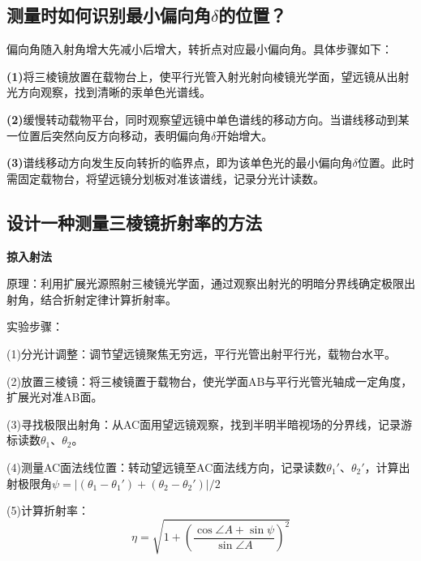 \documentclass[]{../../templates/Report}%
\begin{document}
\begin{fullreportonly}
\subsection{测量时如何识别最小偏向角$\delta$的位置？}
偏向角随入射角增大先减小后增大，转折点对应最小偏向角。具体步骤如下：
\par
\textbf{(1)}将三棱镜放置在载物台上，使平行光管入射光射向棱镜光学面，望远镜从出射光方向观察，找到清晰的汞单色光谱线。
\par
\textbf{(2)}缓慢转动载物平台，同时观察望远镜中单色谱线的移动方向。当谱线移动到某一位置后突然向反方向移动，表明偏向角$\delta$开始增大。
\par
\textbf{(3)}谱线移动方向发生反向转折的临界点，即为该单色光的最小偏向角$\delta$位置。此时需固定载物台，将望远镜分划板对准该谱线，记录分光计读数。
\subsection{设计一种测量三棱镜折射率的方法}
\textbf{掠入射法}
\par
原理：利用扩展光源照射三棱镜光学面，通过观察出射光的明暗分界线确定极限出射角，结合折射定律计算折射率。
\par
实验步骤：
\par
(1)分光计调整：调节望远镜聚焦无穷远，平行光管出射平行光，载物台水平。
\par
(2)放置三棱镜：将三棱镜置于载物台，使光学面AB与平行光管光轴成一定角度，扩展光对准AB面。
\par
(3)寻找极限出射角：从AC面用望远镜观察，找到半明半暗视场的分界线，记录游标读数$\theta_1、\theta_2$。
\par
(4)测量AC面法线位置：转动望远镜至AC面法线方向，记录读数$\theta_1'$、$\theta_2'$，计算出射极限角$\psi = |(\theta_1 - \theta_1') + (\theta_2 - \theta_2')|/2$
\par
(5)计算折射率：
\[
    \eta = \sqrt{1 + (\frac{\cos \angle A + \sin \psi }{\sin \angle A})^2} 
\]
\end{fullreportonly}
\insertnotes
\end{document}
